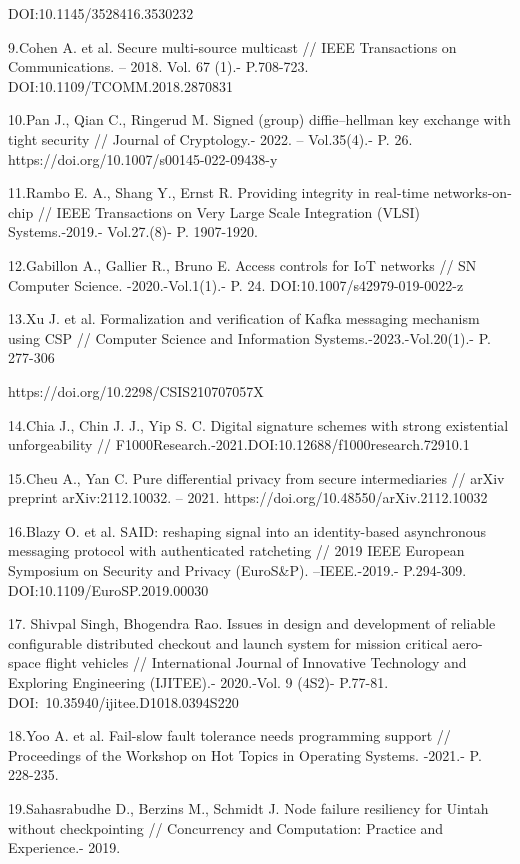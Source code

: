 \begin{noparindent}
DOI:10.1145/3528416.3530232

9.Cohen A. et al. Secure multi-source multicast // IEEE Transactions on
Communications. -- 2018. Vol. 67 (1).- P.708-723.
DOI:10.1109/TCOMM.2018.2870831

10.Pan J., Qian C., Ringerud M. Signed (group) diffie--hellman key
exchange with tight security // Journal of Cryptology.- 2022. --
Vol.35(4).- P. 26. https://doi.org/10.1007/s00145-022-09438-y

11.Rambo E. A., Shang Y., Ernst R. Providing integrity in real-time
networks-on-chip // IEEE Transactions on Very Large Scale Integration
(VLSI) Systems.-2019.- Vol.27.(8)- P. 1907-1920.

12.Gabillon A., Gallier R., Bruno E. Access controls for IoT networks //
SN Computer Science. -2020.-Vol.1(1).- P. 24.
DOI:10.1007/s42979-019-0022-z

13.Xu J. et al. Formalization and verification of Kafka messaging
mechanism using CSP // Computer Science and Information
Systems.-2023.-Vol.20(1).- P. 277-306

https://doi.org/10.2298/CSIS210707057X

14.Chia J., Chin J. J., Yip S. C. Digital signature schemes with strong
existential unforgeability //
F1000Research.-2021.DOI:10.12688/f1000research.72910.1

15.Cheu A., Yan C. Pure differential privacy from secure intermediaries
// arXiv preprint arXiv:2112.10032. -- 2021.
https://doi.org/10.48550/arXiv.2112.10032

16.Blazy O. et al. SAID: reshaping signal into an identity-based
asynchronous messaging protocol with authenticated ratcheting // 2019
IEEE European Symposium on Security and Privacy (EuroS\&P).
--IEEE.-2019.- P.294-309. DOI:10.1109/EuroSP.2019.00030

17. Shivpal Singh, Bhogendra Rao. Issues in design and development of
reliable configurable distributed checkout and launch system for mission
critical aero-space flight vehicles // International Journal of
Innovative Technology and Exploring Engineering (IJITEE).- 2020.-Vol. 9
(4S2)- P.77-81. DOI:~10.35940/ijitee.D1018.0394S220

18.Yoo A. et al. Fail-slow fault tolerance needs programming support //
Proceedings of the Workshop on Hot Topics in Operating Systems. -2021.-
P. 228-235.

19.Sahasrabudhe D., Berzins M., Schmidt J. Node failure resiliency for
Uintah without checkpointing // Concurrency and Computation: Practice
and Experience.- 2019.


\end{noparindent}
